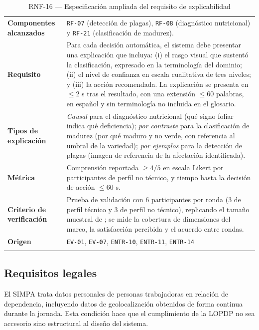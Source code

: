 \documentclass[11pt,a4paper]{article}
\newcommand{\id}[1]{\texttt{\begingroup\hyphenpenalty=10000\relax#1\endgroup}}
\renewcommand{\id}[1]{\texttt{#1}}
\begin{document}
\begin{longtable}{|L{3.4cm}|L{12.0cm}|}
\hline
{}\\
\hline
\textbf{Componentes alcanzados} & \id{RF-07} (detección de plagas), \id{RF-08} (diagnóstico nutricional) y \id{RF-21} (clasificación de madurez). \\ \hline
\textbf{Requisito} & Para cada decisión automática, el sistema debe presentar una explicación que incluya: (i) el rasgo visual que sustentó la clasificación, expresado en la terminología del dominio; (ii) el nivel de confianza en escala cualitativa de tres niveles; y (iii) la acción recomendada. La explicación se presenta en $\leq 2$ s tras el resultado, con una extensión $\leq 60$ palabras, en español y sin terminología no incluida en el glosario. \\ \hline
\textbf{Tipos de explicación} & \emph{Causal} para el diagnóstico nutricional (qué signo foliar indica qué deficiencia); \emph{por contraste} para la clasificación de madurez (por qué maduro y no verde, con referencia al umbral de la variedad); \emph{por ejemplos} para la detección de plagas (imagen de referencia de la afectación identificada). \\ \hline
\textbf{Métrica} & Comprensión reportada $\geq 4/5$ en escala Likert por participantes de perfil no técnico, y tiempo hasta la decisión de acción $\leq 60$ s. \\ \hline
\textbf{Criterio de verificación} & Prueba de validación con 6 participantes por ronda (3 de perfil técnico y 3 de perfil no técnico), replicando el tamaño muestral de \cite{chazette2022}; se mide la cobertura de dimensiones del marco, la satisfacción percibida y el acuerdo entre rondas. \\ \hline
\textbf{Origen} & \footnotesize \id{EV-01}, \id{EV-07}, \id{ENTR-10}, \id{ENTR-11}, \id{ENTR-14} \\ \hline
\caption{RNF-16 --- Especificación ampliada del requisito de explicabilidad}
\end{longtable}

\subsection{Requisitos legales}

El SIMPA trata datos personales de personas trabajadoras en relación de dependencia, incluyendo
datos de geolocalización obtenidos de forma continua durante la jornada. Esta condición hace que el
cumplimiento de la LOPDP \cite{lopdp} no sea accesorio sino estructural al diseño del sistema.
\end{document}
